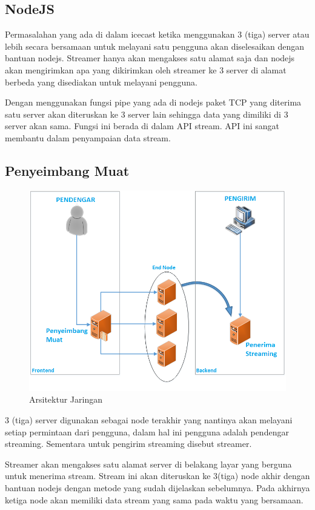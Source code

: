 \documentclass[conference]{IEEEtran}
\begin{document}
	
	\subsection{NodeJS}
	Permasalahan yang ada di dalam icecast ketika menggunakan 3 (tiga) server atau lebih secara bersamaan untuk melayani satu pengguna akan diselesaikan dengan bantuan nodejs. Streamer hanya akan mengakses satu alamat saja dan nodejs akan mengirimkan apa yang dikirimkan oleh streamer ke 3 server di alamat berbeda yang disediakan untuk melayani pengguna.
	
	\indent
	Dengan menggunakan fungsi pipe yang ada di nodejs paket TCP yang diterima satu server akan diteruskan ke 3 server lain sehingga data yang dimiliki di 3 server akan sama. Fungsi ini berada di dalam API stream. API ini sangat membantu dalam penyampaian data stream.
	
	\subsection{Penyeimbang Muat}
	
	\begin{figure}
		\centering
		\includegraphics[width=0.7\linewidth]{arsitektur}
		\caption{Arsitektur Jaringan}
		\label{fig:arsitektur}
	\end{figure}
	
	3 (tiga) server digunakan sebagai node terakhir yang nantinya akan melayani setiap permintaan dari pengguna, dalam hal ini pengguna adalah pendengar streaming. Sementara untuk pengirim streaming disebut streamer. 
	
	\indent
	Streamer akan mengakses satu alamat server di belakang layar yang berguna untuk menerima stream. Stream ini akan diteruskan ke 3(tiga) node akhir dengan bantuan nodejs dengan metode yang sudah dijelaskan sebelumnya. Pada akhirnya ketiga node akan memiliki data stream yang sama pada waktu yang bersamaan.
	
\end{document}
